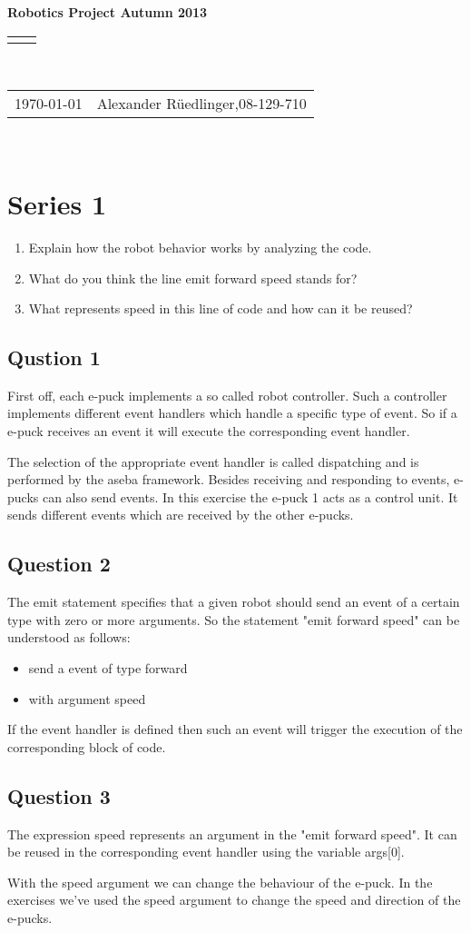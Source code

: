 \documentclass[12pt]{article}
\renewcommand{\title}[1]{\textbf{#1}\\}
\renewcommand{\line}{\begin{tabularx}{\textwidth}{X>{\raggedleft}X}\hline\\\end{tabularx}\\[-0.5cm]}
\newcommand{\leftright}[2]{\begin{tabularx}{\textwidth}{X>{\raggedleft}X}#1%
& #2\\\end{tabularx}\\[-0.5cm]}
\begin{document}
\title{Robotics Project  Autumn 2013}
\line
\leftright{\today}{Alexander Rüedlinger,08-129-710} %
\section*{Series 1}
\begin{enumerate}
	\item Explain how the robot behavior works by analyzing the code.
	\item What do you think the line emit forward speed stands for?
	\item What represents speed in this line of code and how can it be reused?
\end{enumerate}
\subsection*{Qustion 1}
First off, each e-puck implements a so called robot controller. Such a controller implements different event handlers which handle a specific type of event. So if a e-puck receives an event it will execute the corresponding event handler.

The selection of the appropriate event handler is called dispatching and is performed by the aseba framework. Besides receiving and responding to events, e-pucks can also send events.  
In this exercise the e-puck 1 acts as a control unit. It sends different events which are received by the other e-pucks. 
\subsection*{Question 2}
The emit statement specifies that a given robot should send an event of a certain type with zero or more arguments.
So the statement "emit forward speed" can be understood as follows:
\begin{itemize}
	\item send a event of type forward
	\item with argument speed
\end{itemize}
If the event handler is defined then such an event will trigger the execution of the corresponding block of code.
\subsection*{Question 3}
The expression speed represents an argument in the "emit forward speed". It can be reused in the corresponding event handler using the variable args[0].

With the speed argument we can change the behaviour of the e-puck. In the exercises we've used the speed argument to change the speed and direction of the e-pucks.
\end{document}

